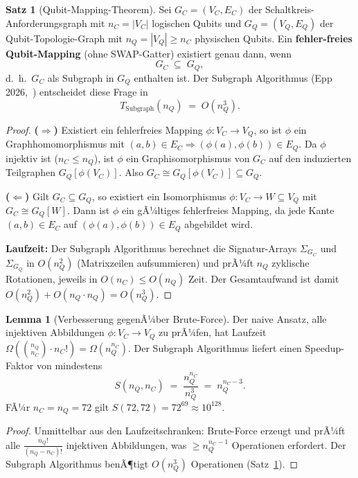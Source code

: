 ﻿\documentclass[a4paper,12pt]{article}
\theoremstyle{definition}
\newtheorem{satz}{Satz}
\newtheorem{lemma}{Lemma}
\begin{document}
\begin{satz}[Qubit-Mapping-Theorem]
\label{satz:mapping}
Sei $G_C = (V_C, E_C)$ der Schaltkreis-Anforderungsgraph mit $n_C = |V_C|$ logischen
Qubits und $G_Q = (V_Q, E_Q)$ der Qubit-Topologie-Graph mit $n_Q = |V_Q| \geq n_C$
physischen Qubits. Ein \textbf{fehler-freies Qubit-Mapping} (ohne SWAP-Gatter)
existiert genau dann, wenn
\[
  G_C \;\subseteq\; G_Q,
\]
d.~h.\ $G_C$ als Subgraph in $G_Q$ enthalten ist. Der Subgraph Algorithmus
(Epp 2026,~\cite{epp2026subgraph}) entscheidet diese Frage in
\[
  T_\mathrm{Subgraph}(n_Q) \;=\; O(n_Q^3).
\]
\end{satz}

\begin{proof}
\textbf{($\Rightarrow$)} Existiert ein fehlerfreies Mapping $\phi: V_C \to V_Q$, so
ist $\phi$ ein Graphhomomorphismus mit $(a,b) \in E_C \Rightarrow
(\phi(a),\phi(b)) \in E_Q$. Da $\phi$ injektiv ist ($n_C \leq n_Q$), ist $\phi$
ein Graphisomorphismus von $G_C$ auf den induzierten Teilgraphen
$G_Q[\phi(V_C)]$. Also $G_C \cong G_Q[\phi(V_C)] \subseteq G_Q$.

\textbf{($\Leftarrow$)} Gilt $G_C \subseteq G_Q$, so existiert ein Isomorphismus
$\phi: V_C \to W \subseteq V_Q$ mit $G_C \cong G_Q[W]$. Dann ist $\phi$ ein
gÃ¼ltiges fehlerfreies Mapping, da jede Kante $(a,b) \in E_C$ auf $(\phi(a),\phi(b))
\in E_Q$ abgebildet wird.

\textbf{Laufzeit:} Der Subgraph Algorithmus berechnet die Signatur-Arrays
$\Sigma_{G_C}$ und $\Sigma_{G_Q}$ in $O(n_Q^2)$ (Matrixzeilen aufsummieren) und
prÃ¼ft $n_Q$ zyklische Rotationen, jeweils in $O(n_C) \leq O(n_Q)$ Zeit. Der
Gesamtaufwand ist damit $O(n_Q^2) + O(n_Q \cdot n_Q) = O(n_Q^3)$.
\end{proof}

\begin{lemma}[Verbesserung gegenÃ¼ber Brute-Force]
\label{lemma:speedup}
Der naive Ansatz, alle injektiven Abbildungen $\phi: V_C \to V_Q$ zu prÃ¼fen, hat
Laufzeit $\Omega\!\left(\binom{n_Q}{n_C} \cdot n_C!\right) = \Omega(n_Q^{n_C})$.
Der Subgraph Algorithmus liefert einen Speedup-Faktor von mindestens
\[
  S(n_Q, n_C) \;=\; \frac{n_Q^{n_C}}{n_Q^3} \;=\; n_Q^{n_C - 3}.
\]
FÃ¼r $n_C = n_Q = 72$ gilt $S(72, 72) = 72^{69} \approx 10^{128}$.
\end{lemma}

\begin{proof}
Unmittelbar aus den Laufzeitschranken: Brute-Force erzeugt und prÃ¼ft alle
$\frac{n_Q!}{(n_Q - n_C)!}$ injektiven Abbildungen, was $\geq n_Q^{n_C - 1}$
Operationen erfordert. Der Subgraph Algorithmus benÃ¶tigt $O(n_Q^3)$
Operationen (Satz~\ref{satz:mapping}).
\end{proof}
\end{document}
